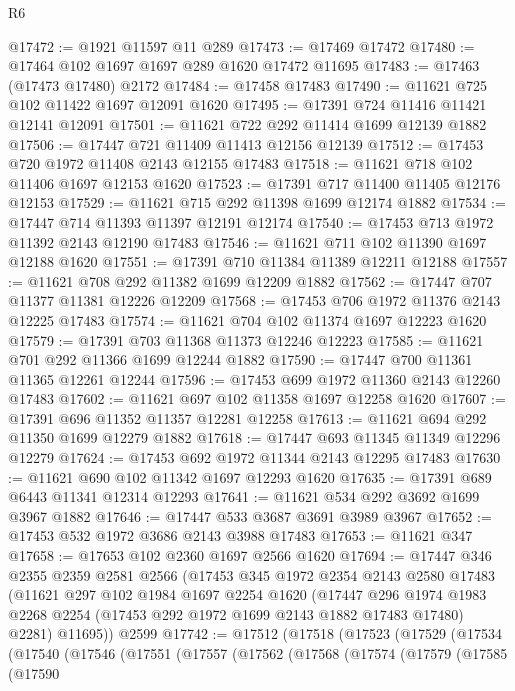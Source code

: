 \begin{lexlean}{R6}
\begin{coremodule}
@17472 := @1921 @11597 @11 @289
@17473 := @17469 @17472
@17480 := @17464 @102 @1697 @1697 @289 @1620 @17472 @11695
@17483 := @17463 (@17473 @17480) @2172
@17484 := @17458 @17483
@17490 := @11621 @725 @102 @11422 @1697 @12091 @1620
@17495 := @17391 @724 @11416 @11421 @12141 @12091
@17501 := @11621 @722 @292 @11414 @1699 @12139 @1882
@17506 := @17447 @721 @11409 @11413 @12156 @12139
@17512 := @17453 @720 @1972 @11408 @2143 @12155 @17483
@17518 := @11621 @718 @102 @11406 @1697 @12153 @1620
@17523 := @17391 @717 @11400 @11405 @12176 @12153
@17529 := @11621 @715 @292 @11398 @1699 @12174 @1882
@17534 := @17447 @714 @11393 @11397 @12191 @12174
@17540 := @17453 @713 @1972 @11392 @2143 @12190 @17483
@17546 := @11621 @711 @102 @11390 @1697 @12188 @1620
@17551 := @17391 @710 @11384 @11389 @12211 @12188
@17557 := @11621 @708 @292 @11382 @1699 @12209 @1882
@17562 := @17447 @707 @11377 @11381 @12226 @12209
@17568 := @17453 @706 @1972 @11376 @2143 @12225 @17483
@17574 := @11621 @704 @102 @11374 @1697 @12223 @1620
@17579 := @17391 @703 @11368 @11373 @12246 @12223
@17585 := @11621 @701 @292 @11366 @1699 @12244 @1882
@17590 := @17447 @700 @11361 @11365 @12261 @12244
@17596 := @17453 @699 @1972 @11360 @2143 @12260 @17483
@17602 := @11621 @697 @102 @11358 @1697 @12258 @1620
@17607 := @17391 @696 @11352 @11357 @12281 @12258
@17613 := @11621 @694 @292 @11350 @1699 @12279 @1882
@17618 := @17447 @693 @11345 @11349 @12296 @12279
@17624 := @17453 @692 @1972 @11344 @2143 @12295 @17483
@17630 := @11621 @690 @102 @11342 @1697 @12293 @1620
@17635 := @17391 @689 @6443 @11341 @12314 @12293
@17641 := @11621 @534 @292 @3692 @1699 @3967 @1882
@17646 := @17447 @533 @3687 @3691 @3989 @3967
@17652 := @17453 @532 @1972 @3686 @2143 @3988 @17483
@17653 := @11621 @347
@17658 := @17653 @102 @2360 @1697 @2566 @1620
@17694 := @17447
    @346
    @2355
    @2359
    @2581
    @2566
    (@17453
      @345
      @1972
      @2354
      @2143
      @2580
      @17483
      (@11621
        @297
        @102
        @1984
        @1697
        @2254
        @1620
        (@17447
          @296
          @1974
          @1983
          @2268
          @2254
          (@17453 @292 @1972 @1699 @2143 @1882 @17483 @17480)
          @2281)
        @11695))
    @2599
@17742 := @17512
    (@17518
      (@17523
        (@17529
          (@17534
            (@17540
              (@17546
                (@17551
                  (@17557
                    (@17562
                      (@17568
                        (@17574
                          (@17579
                            (@17585
                              (@17590

\end{coremodule}
\end{lexlean}
